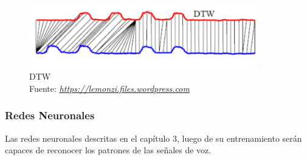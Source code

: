 \begin{figure}[H]
	\centering
	\includegraphics[width=0.9\textwidth]{Figures/dtw.png}
	\caption{DTW\\ Fuente:  \href{https://lemonzi.files.wordpress.com/2013/01/dtw.pdf}{\textit{https://lemonzi.files.wordpress.com}}}
	\label{onda}
\end{figure} 

\subsubsection{Redes Neuronales}
Las redes neuronales descritas en el capítulo 3, luego de su entrenamiento serán capaces de reconocer los patrones de las señales de voz.